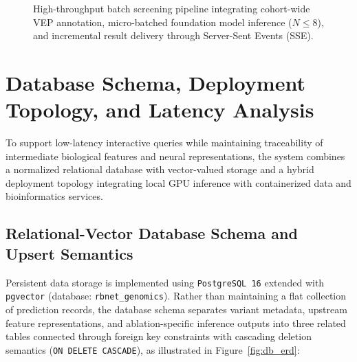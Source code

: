 \begin{figure}[htbp]
    \centering
    \caption{High-throughput batch screening pipeline integrating cohort-wide VEP annotation, micro-batched foundation model inference ($N \leq 8$), and incremental result delivery through Server-Sent Events (SSE).}
    \label{fig:batch_sse}
\end{figure}



\section{Database Schema, Deployment Topology, and Latency Analysis}
\label{sec:db_deployment_benchmarks}

To support low-latency interactive queries while maintaining traceability of intermediate biological features and neural representations, the system combines a normalized relational database with vector-valued storage and a hybrid deployment topology integrating local GPU inference with containerized data and bioinformatics services.

\subsection{Relational-Vector Database Schema and Upsert Semantics}

Persistent data storage is implemented using \texttt{PostgreSQL 16} extended with \texttt{pgvector} (database: \texttt{rbnet\_genomics}). Rather than maintaining a flat collection of prediction records, the database schema separates variant metadata, upstream feature representations, and ablation-specific inference outputs into three related tables connected through foreign key constraints with cascading deletion semantics (\texttt{ON DELETE CASCADE}), as illustrated in Figure~\ref{fig:db_erd}:

